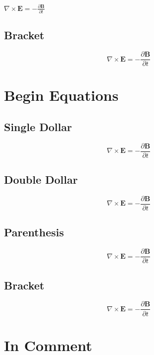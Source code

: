 {{{{\(\nabla \times \mathbf{E} = - \frac{\partial \mathbf{B}}{\partial t}\)

\chapter{Bracket}
\label{bracket}

\[\nabla \times \mathbf{E} = - \frac{\partial \mathbf{B}}{\partial t}\]

\part{Begin Equations}
\label{beginequations}

\chapter{Single Dollar}
\label{singledollar}

\begin{equation}\nabla \times \mathbf{E} = - \frac{\partial \mathbf{B}}{\partial t}\end{equation}

\chapter{Double Dollar}
\label{doubledollar}

\begin{equation}\nabla \times \mathbf{E} = - \frac{\partial \mathbf{B}}{\partial t}\end{equation}

\chapter{Parenthesis}
\label{parenthesis}

\begin{equation}\nabla \times \mathbf{E} = - \frac{\partial \mathbf{B}}{\partial t}\end{equation}

\chapter{Bracket}
\label{bracket}

\begin{equation}\nabla \times \mathbf{E} = - \frac{\partial \mathbf{B}}{\partial t}\end{equation}

\part{In Comment}
\label{incomment}

}}}}

